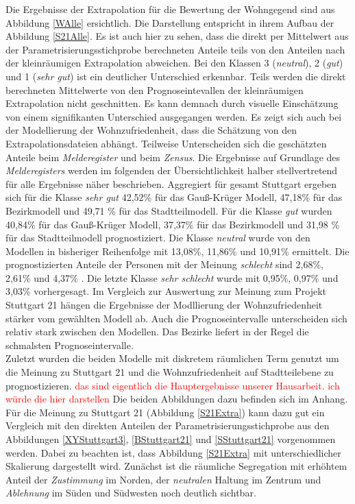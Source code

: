 \documentclass{Vorlage}
\begin{document}
Die Ergebnisse der Extrapolation für die Bewertung der Wohngegend sind aus Abbildung \ref{WAlle} ersichtlich. Die Darstellung entspricht in ihrem Aufbau der Abbildung \ref{S21Alle}. Es ist auch hier zu sehen, dass die direkt per Mittelwert aus der Parametrisierungsstichprobe berechneten Anteile teils von den Anteilen nach der kleinräumigen Extrapolation abweichen. Bei den Klassen 3 (\textit{neutral}), 2 (\textit{gut}) und 1 (\textit{sehr gut}) ist ein deutlicher Unterschied erkennbar. Teils werden die direkt berechneten Mittelwerte von den Prognoseintevallen der kleinräumigen Extrapolation nicht geschnitten. Es kann demnach durch visuelle Einschätzung von einem signifikanten Unterschied ausgegangen werden. Es zeigt sich auch bei der Modellierung der Wohnzufriedenheit, dass die Schätzung von den Extrapolationsdateien abhängt. Teilweise Unterscheiden sich die geschätzten Anteile beim \textit{Melderegister} und beim \textit{Zensus}. Die Ergebnisse auf Grundlage des \textit{Melderegisters} werden im folgenden der Übersichtlichkeit halber stellvertretend für alle Ergebnisse näher beschrieben. Aggregiert für gesamt Stuttgart ergeben sich für die Klasse \textit{sehr gut} 42,52\% für das Gauß-Krüger Modell, 47,18\% für das Bezirkmodell und 49,71 \% für das Stadtteilmodell. Für die Klasse \textit{gut} wurden 40,84\% für das Gauß-Krüger Modell, 37,37\% für das Bezirkmodell und 31,98 \% für das Stadtteilmodell prognostiziert. Die Klasse \textit{neutral} wurde von den Modellen in bisheriger Reihenfolge mit 13,08\%, 11,86\% und 10,91\% ermittelt. Die prognostizierten Anteile der Personen mit der Meinung \textit{schlecht}  sind 2,68\%, 2,61\% und 4,37\% . Die letzte Klasse \textit{sehr schlecht} wurde mit 0,95\%, 0,97\% und 3,03\% vorhergesagt. Im Vergleich zur Auswertung zur Meinung zum Projekt Stuttgart 21 hängen die Ergebnisse der Modllierung der Wohnzufriedenheit stärker vom gewählten Modell ab. Auch die Prognoseintervalle unterscheiden sich relativ stark zwischen den Modellen. Das Bezirke liefert in der Regel die schmalsten Prognoseintervalle.\\
Zuletzt wurden die beiden Modelle mit diskretem räumlichen Term genutzt um die Meinung zu Stuttgart 21 und die Wohnzufriedenheit auf Stadtteilebene zu prognostizieren. \textcolor{red}{das sind eigentlich die Hauptergebnisse unserer Hausarbeit. ich würde die hier darstellen} Die beiden Abbildungen dazu befinden sich im Anhang. Für die Meinung zu Stuttgart 21 (Abbildung \ref{S21Extra}) kann dazu gut ein Vergleich mit den direkten Anteilen der Parametrisierungsstichprobe aus den Abbildungen \ref{XYStuttgart3}, \ref{BStuttgart21} und \ref{SStuttgart21} vorgenommen werden. Dabei zu beachten ist, dass Abbildung \ref{S21Extra} mit unterschiedlicher Skalierung dargestellt wird. Zunächst ist die räumliche Segregation mit erhöhtem Anteil der \textit{Zustimmung} im Norden, der \textit{neutralen} Haltung im Zentrum und \textit{Ablehnung} im Süden und Südwesten noch deutlich sichtbar.\\
\end{document}

